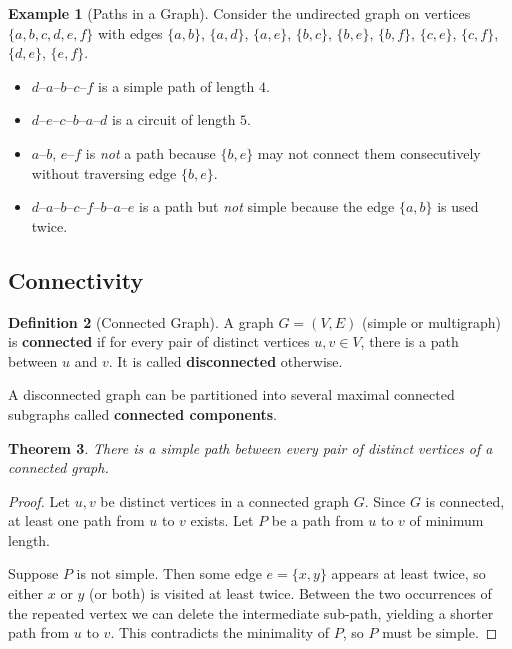 \documentclass[11pt, a4paper, notitlepage]{report}
\newtheorem{theorem}{Theorem}[section]
\theoremstyle{definition}
\newtheorem{definition}[theorem]{Definition}
\newtheorem{example}[theorem]{Example}
\theoremstyle{remark}
\begin{document}
\begin{example}[Paths in a Graph]
\label{ex:paths}
Consider the undirected graph on vertices $\{a,b,c,d,e,f\}$ with edges
$\{a,b\}$, $\{a,d\}$, $\{a,e\}$, $\{b,c\}$, $\{b,e\}$, $\{b,f\}$, $\{c,e\}$, $\{c,f\}$,
$\{d,e\}$, $\{e,f\}$.
\begin{itemize}
  \item $d$--$a$--$b$--$c$--$f$ is a simple path of length $4$.
  \item $d$--$e$--$c$--$b$--$a$--$d$ is a circuit of length $5$.
  \item $a$--$b$, $e$--$f$ is \emph{not} a path because $\{b,e\}$ may not connect them
    consecutively without traversing edge $\{b,e\}$.
  \item $d$--$a$--$b$--$c$--$f$--$b$--$a$--$e$ is a path but \emph{not} simple because the
    edge $\{a,b\}$ is used twice.
\end{itemize}
\end{example}

\subsection{Connectivity}
\label{subsec:connectivity}

\begin{definition}[Connected Graph]
\label{def:connected}
A graph $G = (V,E)$ (simple or multigraph) is \textbf{connected} if for every pair of
distinct vertices $u, v \in V$, there is a path between $u$ and $v$. It is called
\textbf{disconnected} otherwise.

A disconnected graph can be partitioned into several maximal connected subgraphs called
\textbf{connected components}.
\end{definition}

\begin{theorem}
\label{thm:simple-path-connected}
There is a simple path between every pair of distinct vertices of a connected graph.
\end{theorem}

\begin{proof}
Let $u, v$ be distinct vertices in a connected graph $G$. Since $G$ is connected, at least one
path from $u$ to $v$ exists. Let $P$ be a path from $u$ to $v$ of minimum length.

Suppose $P$ is not simple. Then some edge $e = \{x,y\}$ appears at least twice, so either $x$
or $y$ (or both) is visited at least twice. Between the two occurrences of the repeated vertex
we can delete the intermediate sub-path, yielding a shorter path from $u$ to $v$. This
contradicts the minimality of $P$, so $P$ must be simple.
\end{proof}
\end{document}
